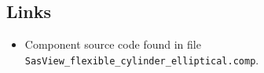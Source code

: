 \subsection*{Links}
\begin{itemize}
  \item Component source code found in file \texttt{SasView\_flexible\_cylinder\_elliptical.comp}.
\end{itemize}
